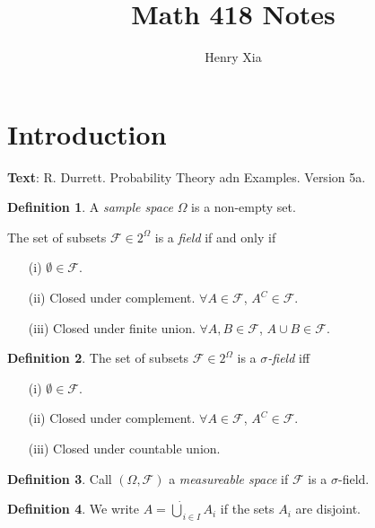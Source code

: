 \documentclass[11pt]{article}
\title{Math 418 Notes}
\author{Henry Xia}
\theoremstyle{definition}
\newtheorem{defn}{Definition}[section]
\begin{document}
\maketitle

\tableofcontents


\section{Introduction}

\textbf{Text}: R. Durrett. Probability Theory adn Examples. Version 5a.

\begin{defn}
    A \emph{sample space} $\Omega$ is a non-empty set.

    The set of subsets $\mathcal{F} \in 2^\Omega$ is a \emph{field} if and only if
    \begin{enumerate}
        \item[(i)] $\emptyset\in\mathcal{F}$.
        \item[(ii)] Closed under complement. $\forall A \in \mathcal{F}$, $A^C \in \mathcal{F}$.
        \item[(iii)] Closed under finite union. $\forall A,B \in \mathcal{F}$, $A\cup B \in \mathcal{F}$.
    \end{enumerate}
\end{defn}

\begin{defn}
    The set of subsets $\mathcal{F} \in 2^\Omega$ is a \emph{$\sigma$-field} iff 
    \begin{enumerate}
        \item[(i)] $\emptyset\in\mathcal{F}$.
        \item[(ii)] Closed under complement. $\forall A \in \mathcal{F}$, $A^C \in \mathcal{F}$.
        \item[(iii)] Closed under countable union.
    \end{enumerate}
\end{defn}

\begin{defn}
    Call $(\Omega, \mathcal{F})$ a \emph{measureable space} if $\mathcal{F}$ is a $\sigma$-field.
\end{defn}

\begin{defn}
    We write $A = \dot\bigcup_{i\in{I}} A_i$ if the sets $A_i$ are disjoint.
\end{defn}
\end{document}

